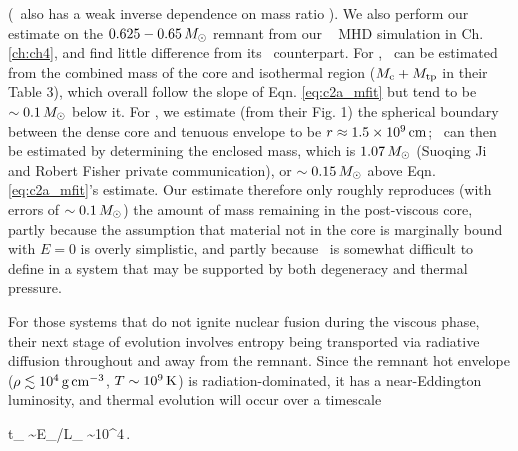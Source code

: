 \noindent (\Mcpv\ also has a weak inverse dependence on mass ratio \qm).  We also perform our estimate on the $0.625 - 0.65\,\Msun$ remnant from our \arepo\ \citep{spri10} MHD simulation in Ch. \ref{ch:ch4}, and find little difference from its \gasoline\ counterpart.  For \cite{schw+12}, \Mcpv\ can be estimated from the combined mass of the core and isothermal region ($M_\mathrm{c} + M_\mathrm{tp}$ in their Table 3), which overall follow the slope of Eqn. \ref{eq:c2a_mfit} but tend to be $\sim0.1\,\Msun$ below it.  For \cite{ji+13}, we estimate (from their Fig. 1) the spherical boundary between the dense core and tenuous envelope to be $r \approx 1.5\times10^9\,\mathrm{cm}$; \Mcpv\ can then be estimated by determining the enclosed mass, which is $1.07\,\Msun$ (Suoqing Ji and Robert Fisher private communication), or $\sim0.15\,\Msun$ above Eqn. \ref{eq:c2a_mfit}'s estimate.  Our estimate therefore only roughly reproduces (with errors of $\sim0.1\,\Msun$) the amount of mass remaining in the post-viscous core, partly because the assumption that material not in the core is marginally bound with $E = 0$ is overly simplistic, and partly because \Mcpv\ is somewhat difficult to define in a system that may be supported by both degeneracy and thermal pressure.



For those systems that do not ignite nuclear fusion during the viscous phase, their next stage of evolution involves entropy being transported via radiative diffusion throughout and away from the remnant.  Since the remnant hot envelope ($\rho \lesssim 10^4\,\gcc$, $T \sim 10^9\,\mathrm{K}$) is radiation-dominated, it has a near-Eddington luminosity, and thermal evolution will occur over a timescale \citep{shen+12}

\eqbegin
t_ \sim E_/L_ \sim 10^4\,.
\eqend

